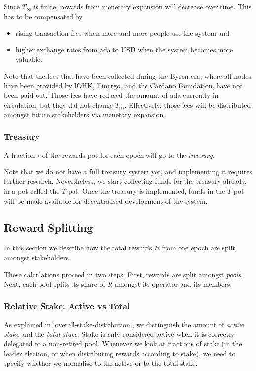 \documentclass[11pt,a4paper,dvipsnames,twosided]{article}
\begin{document}
Since \(T_\infty\) is finite, rewards from monetary expansion will
decrease over time. This has to be compensated by

\begin{itemize}
\item
  rising transaction fees when more and more people use the system and
\item
  higher exchange rates from ada to USD when the system becomes more
  valuable.
\end{itemize}

Note that the fees that have been collected during the Byron era,
where all nodes have been provided by IOHK, Emurgo, and the Cardano
Foundation, have not been paid out. Those fees have reduced the amount
of ada currently in circulation, but they did not change
\(T_\infty\). Effectively, those fees will be distributed amongst
future stakeholders via monetary expansion.

\subsubsection{Treasury}
\label{treasury}

A fraction \(\tau\) of the rewards pot for each epoch will go to the
\emph{treasury}.

Note that we do not have a full treasury system yet, and implementing it
requires further research. Nevertheless, we start collecting funds for the
treasury already, in a pot called the \(T\) pot. Once the treasury is
implemented, funds in the \(T\) pot will be made available for decentralised
development of the system.

\subsection{Reward Splitting}
\label{reward-splitting}

In this section we describe how the total rewards \(R\) from one epoch
are split amongst stakeholders.

These calculations proceed in two steps: First, rewards are split
amongst \emph{pools}. Next, each pool splits its share of \(R\) amongst
its operator and its members.

\subsubsection{Relative Stake: Active vs Total}
As explained in \cref{overall-stake-distribution}, we distinguish the amount of
\emph{active stake} and the \emph{total stake}. Stake is only considered active
when it is correctly delegated to a non-retired pool. Whenever we look at
fractions of stake (in the leader election, or when distributing rewards
according to stake), we need to specify whether we normalise to the active or to
the total stake.
\end{document}
